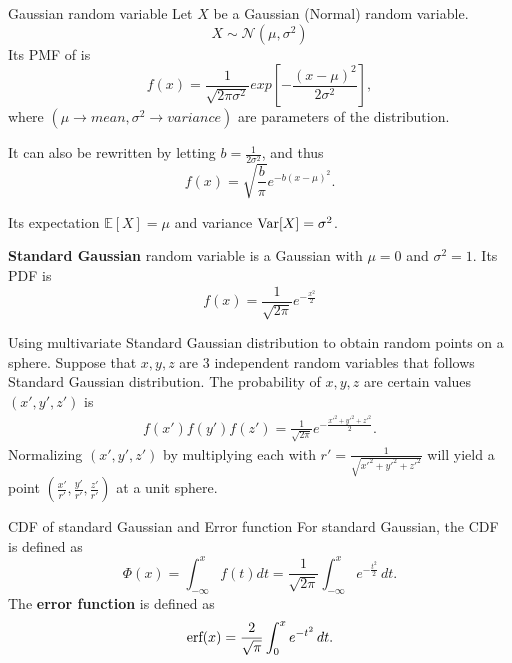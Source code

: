 \begin{fact}{Gaussian random variable}{}
  Let $X$ be a Gaussian (Normal) random variable.
  \begin{equation*}
      X \sim \mathcal{N}(\mu,\sigma^2)
  \end{equation*}
  Its PMF of is
  \begin{equation*}
    f(x)=\frac{1}{\sqrt{2\pi\sigma^2}}exp\left[-\frac{(x-\mu)^2}{2\sigma^2}\right],
  \end{equation*}
  where $(\mu\rightarrow mean,\sigma^2\rightarrow variance)$ are parameters of the distribution.

  It can also be rewritten by letting $b=\frac{1}{2\sigma^2}$, and thus
  \begin{equation*}
    f(x)=\sqrt{\frac{b}{\pi}}e^{-b(x-\mu)^2}.
  \end{equation*}

  Its expectation $\mathbb{E}[X]=\mu$ and variance $\operatorname{\mathrm{Var}}[X]=\sigma^2$.

  \textbf{Standard Gaussian} random variable is a Gaussian with $\mu=0$ and $\sigma^2=1$. Its PDF is
  \begin{equation*}
    f(x)=\frac{1}{\sqrt{2\pi}}e^{-\frac{x^2}{2}}
  \end{equation*}
\end{fact}

\begin{exec}
  Using multivariate Standard Gaussian distribution to obtain random points on a sphere.
  \tcblower
  Suppose that $x,y,z$ are 3 independent random variables that follows Standard Gaussian distribution.
  The probability of $x,y,z$ are certain values $(x',y',z')$ is
  \begin{align*}
    f(x')f(y')f(z')=\frac{1}{\sqrt{2\pi}}e^{-\frac{x'^2+y'^2+z'^2}{2}}.
  \end{align*}
  Normalizing $(x',y',z')$ by multiplying each with $r'=\frac{1}{\sqrt{x'^2+y'^2+z'^2}}$ will yield a point $(\frac{x'}{r'},\frac{y'}{r'},\frac{z'}{r'})$ at a unit sphere.
\end{exec}

\begin{fact}{CDF of standard Gaussian and Error function}{}
  For standard Gaussian, the CDF is defined as
  \begin{equation*}
    \Phi(x)=\int_{-\infty}^{x}f(t)dt=\frac{1}{\sqrt{2\pi}}\int_{-\infty}^{x} e^{-\frac{t^2}{2}}\,dt.
  \end{equation*}
  The \textbf{error function} is defined as
  \begin{equation*}
    \operatorname{\text{erf}} (x)=\frac{2}{\sqrt{\pi}}\int_{0}^{x}e^{-t^2}\,dt.
  \end{equation*}
\end{fact}

